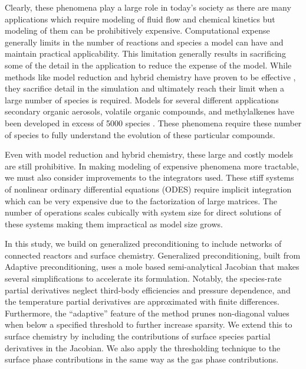 \documentclass{article}
\begin{document}
Clearly, these phenomena play a large role in today's society as there are many applications which require modeling of fluid flow and chemical kinetics but modeling of them can be prohibitively expensive.
Computational expense generally limits in the number of reactions and species a model can have and maintain practical applicability.
This limitation generally results in sacrificing some of the detail in the application to reduce the expense of the model.
While methods like model reduction and hybrid chemistry have proven to be effective \cite{Lu2009, Pepiot2019}, they sacrifice detail in the simulation and ultimately reach their limit when a large number of species is required.
Models for several different applications secondary organic aerosols, volatile organic compounds, and methylalkenes have been developed in excess of 5000 species \cite{saunders1997world, li_modeling_2015, sarathy_comprehensive_2011}.
These phenomena require these number of species to fully understand the evolution of these particular compounds.

Even with model reduction and hybrid chemistry, these large and costly models are still prohibitive.
In making modeling of expensive phenomena more tractable, we must also consider improvements to the integrators used.
These stiff systems of nonlinear ordinary differential equations (ODES) require implicit integration which can be very expensive due to the factorization of large matrices.
The number of operations scales cubically with system size for direct solutions of these systems making them impractical as model size grows.

In this study, we build on generalized preconditioning \cite{walker2022generalized} to include networks of connected reactors and surface chemistry.
Generalized preconditioning, built from Adaptive preconditioning\cite{mcnenly_faster_2015}, uses a mole based semi-analytical Jacobian that makes several simplifications to accelerate its formulation.
Notably, the species-rate partial derivatives neglect third-body efficiencies and pressure dependence, and the temperature partial derivatives are approximated with finite differences.
Furthermore, the ``adaptive'' feature of the method prunes non-diagonal values when below a specified threshold to further increase sparsity.
We extend this to surface chemistry by including the contributions of surface species partial derivatives in the Jacobian.
We also apply the thresholding technique to the surface phase contributions in the same way as the gas phase contributions.
\end{document}
